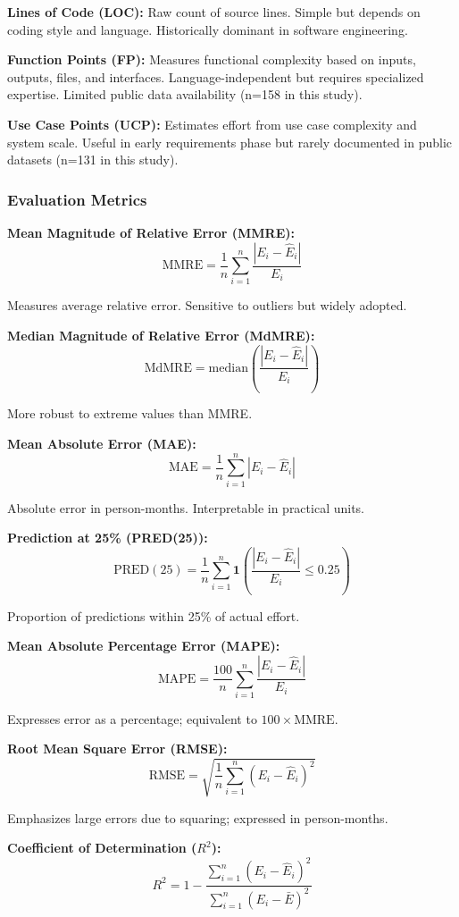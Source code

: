 \documentclass[11pt,a4paper]{article}
\begin{document}
\textbf{Lines of Code (LOC):} Raw count of source lines. Simple but depends on coding style and language. Historically dominant in software engineering.

\textbf{Function Points (FP):} Measures functional complexity based on inputs, outputs, files, and interfaces. Language-independent but requires specialized expertise. Limited public data availability (n=158 in this study).

\textbf{Use Case Points (UCP):} Estimates effort from use case complexity and system scale. Useful in early requirements phase but rarely documented in public datasets (n=131 in this study).

\subsubsection{Evaluation Metrics}

\textbf{Mean Magnitude of Relative Error (MMRE):}
$$\text{MMRE} = \frac{1}{n}\sum_{i=1}^{n}\frac{|E_i - \hat{E}_i|}{E_i}$$

Measures average relative error. Sensitive to outliers but widely adopted.

\textbf{Median Magnitude of Relative Error (MdMRE):}
$$\text{MdMRE} = \text{median}\left(\frac{|E_i - \hat{E}_i|}{E_i}\right)$$

More robust to extreme values than MMRE.

\textbf{Mean Absolute Error (MAE):}
$$\text{MAE} = \frac{1}{n}\sum_{i=1}^{n}|E_i - \hat{E}_i|$$

Absolute error in person-months. Interpretable in practical units.

\textbf{Prediction at 25\% (PRED(25)):}
$$\text{PRED}(25) = \frac{1}{n}\sum_{i=1}^{n}\mathbf{1}\left(\frac{|E_i - \hat{E}_i|}{E_i} \leq 0.25\right)$$

Proportion of predictions within 25\% of actual effort.

\textbf{Mean Absolute Percentage Error (MAPE):}
$$\text{MAPE} = \frac{100}{n}\sum_{i=1}^{n}\frac{|E_i - \hat{E}_i|}{E_i}$$

Expresses error as a percentage; equivalent to $100 \times \text{MMRE}$.

\textbf{Root Mean Square Error (RMSE):}
$$\text{RMSE} = \sqrt{\frac{1}{n}\sum_{i=1}^{n}(E_i - \hat{E}_i)^2}$$

Emphasizes large errors due to squaring; expressed in person-months.

\textbf{Coefficient of Determination ($R^2$):}
$$R^2 = 1 - \frac{\sum_{i=1}^{n}(E_i - \hat{E}_i)^2}{\sum_{i=1}^{n}(E_i - \bar{E})^2}$$
\end{document}
